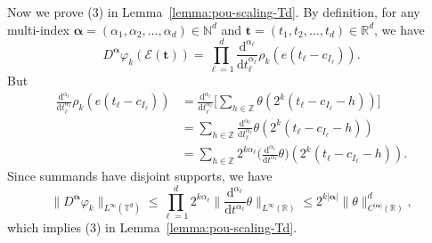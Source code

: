\documentclass[12pt]{amsart}
\theoremstyle{definition}
\theoremstyle{remark}
\newcommand{\bt}{\boldsymbol{t}}
\newcommand{\R}{\mathbb{R}}
\newcommand{\N}{\mathbb{N}}
\newcommand{\Z}{\mathbb{Z}}
\newcommand{\T}{\mathbb{T}}
\numberwithin{equation}{section}
\begin{document}
Now we prove (3) in Lemma~\ref{lemma:pou-scaling-Td}. By definition, for any multi-index $\boldsymbol{\alpha}=(\alpha_1,\alpha_2,\ldots,\alpha_d)\in \N^d$ and $\bt=(t_1,t_2,\ldots,t_d)\in \R^d$, we have
\[
D^{\boldsymbol{\alpha}}\varphi_k(\mathcal{E}(\bt))=\prod_{\ell=1}^d \frac{\mathrm{d}^{\alpha_\ell}}{\mathrm{d}t_\ell^{\alpha_\ell}}\rho_k(e(t_\ell-c_{I_\ell})).
\]
But
\begin{align*}
\frac{\mathrm{d}^{\alpha_\ell}}{\mathrm{d}t_\ell^{\alpha_\ell}}\rho_k(e(t_\ell-c_{I_\ell}))&=\frac{\mathrm{d}^{\alpha_\ell}}{\mathrm{d}t_\ell^{\alpha_\ell}}\bigg[\sum_{h\in \Z} \theta(2^k(t_\ell-c_{I_\ell}-h))\bigg]
\\
&=\sum_{h\in \Z} \frac{\mathrm{d}^{\alpha_\ell}}{\mathrm{d}t_\ell^{\alpha_\ell}}\theta(2^k(t_\ell-c_{I_\ell}-h))\\
&=\sum_{h\in \Z} 2^{k\alpha_\ell}\bigg(\frac{\mathrm{d}^{\alpha_\ell}}{\mathrm{d}t^{\alpha_\ell}}\theta\bigg)(2^k(t_\ell-c_{I_\ell}-h)).
\end{align*}
Since summands have disjoint supports, we have
\[
\bigg\|D^{\boldsymbol{\alpha}}\varphi_k\bigg\|_{L^\infty(\T^d)}\le \prod_{\ell=1}^d 2^{k\alpha_\ell}\bigg\|\frac{\mathrm{d}^{\alpha_\ell}}{\mathrm{d}t^{\alpha_\ell}}\theta\bigg\|_{L^\infty(\R)}\le 2^{k|\boldsymbol{\alpha}|}\|\theta\|_{C^{|\boldsymbol{\alpha}|}(\R)}^d,
\]
which implies (3) in Lemma~\ref{lemma:pou-scaling-Td}. 
\end{document}

